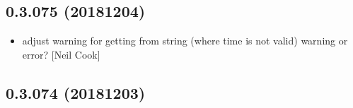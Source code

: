 \documentclass[a4paper,10pt,english]{report}
\begin{document}
\subsection{0.3.075 (2018\sphinxhyphen{}12\sphinxhyphen{}04)}
\label{\detokenize{misc/changelog:id267}}\begin{itemize}
\item {} 
 \sphinxhyphen{} adjust warning for getting  from string
(where time is not valid) \sphinxhyphen{} warning or error? {[}Neil Cook{]}

\end{itemize}


\subsection{0.3.074 (2018\sphinxhyphen{}12\sphinxhyphen{}03)}
\end{document}
